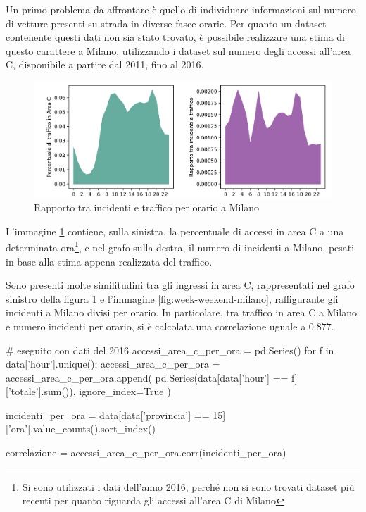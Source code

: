 \documentclass[a4paper,12pt]{report}
\begin{document}
Un primo problema da affrontare è quello di individuare informazioni sul 
numero di vetture presenti su strada in diverse fasce orarie. 
Per quanto un dataset contenente questi dati non sia stato trovato, 
è possibile realizzare una stima di questo carattere a Milano, 
utilizzando i dataset sul numero degli accessi all'area C, 
disponibile a partire dal 2011, fino al 2016.

\begin{figure}
    \includegraphics[width=\linewidth]{../src/area_c/rapporto_orario.png}
    \caption{Rapporto tra incidenti e traffico per orario a Milano}
    \label{fig:rapporto-incidenti-traffico}
\end{figure}

L'immagine \ref{fig:rapporto-incidenti-traffico} contiene, sulla sinistra, 
la percentuale di accessi in area C a una determinata 
ora\footnote{Si sono utilizzati i dati dell'anno 2016, perché non si sono trovati 
dataset più recenti per quanto riguarda gli accessi all'area C di Milano}, 
e nel grafo sulla destra, il numero di incidenti a Milano, pesati in base alla 
stima appena realizzata del traffico.

Sono presenti molte similitudini tra gli ingressi in area C, 
rappresentati nel grafo sinistro della 
figura \ref{fig:rapporto-incidenti-traffico} e l'immagine \ref{fig:week-weekend-milano}, 
raffigurante gli incidenti a Milano divisi per orario. 
In particolare, tra traffico in area C a Milano e 
numero incidenti per orario, si è calcolata una correlazione uguale a $0.877$.

\begin{code}
# eseguito con dati del 2016
accessi_area_c_per_ora = pd.Series()
for f in data['hour'].unique():
    accessi_area_c_per_ora = accessi_area_c_per_ora.append(
        pd.Series(data[data['hour'] == f]['totale'].sum()), 
        ignore_index=True
        )

incidenti_per_ora = data[data['provincia'] == 15]['ora'].value_counts().sort_index()

correlazione = accessi_area_c_per_ora.corr(incidenti_per_ora)
\end{code}
\end{document}
